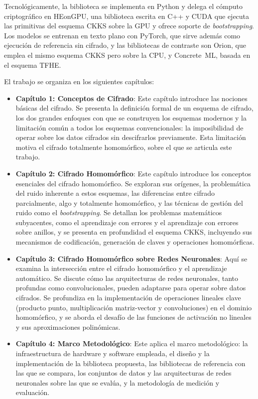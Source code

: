 Tecnológicamente, la biblioteca se implementa en Python y delega el cómputo criptográfico en HEonGPU, una biblioteca escrita en C++ y CUDA que ejecuta las primitivas del esquema CKKS sobre la GPU y ofrece soporte de \textit{bootstrapping}. Los modelos se entrenan en texto plano con PyTorch, que sirve además como ejecución de referencia sin cifrado, y las bibliotecas de contraste son Orion, que emplea el mismo esquema CKKS pero sobre la CPU, y Concrete~ML, basada en el esquema TFHE.

El trabajo se organiza en los siguientes capítulos:

\begin{itemize}
   \item \textbf{Capítulo 1: Conceptos de Cifrado}:
Este capítulo introduce las nociones básicas del cifrado. Se presenta la definición formal de un esquema de cifrado, los dos grandes enfoques con que se construyen los esquemas modernos y la limitación común a todos los esquemas convencionales: la imposibilidad de operar sobre los datos cifrados sin descifrarlos previamente. Esta limitación motiva el cifrado totalmente homomórfico, sobre el que se articula este trabajo.

   \item \textbf{Capítulo 2: Cifrado Homomórfico}:
Este capítulo introduce los conceptos esenciales del cifrado homomórfico. Se exploran sus orígenes, la problemática del ruido inherente a estos esquemas, las diferencias entre cifrado parcialmente, algo y totalmente homomórfico, y las técnicas de gestión del ruido como el \textit{bootstrapping}. Se detallan los problemas matemáticos subyacentes, como el aprendizaje con errores y el aprendizaje con errores sobre anillos, y se presenta en profundidad el esquema CKKS, incluyendo sus mecanismos de codificación, generación de claves y operaciones homomórficas.

   \item \textbf{Capítulo 3: Cifrado Homomórfico sobre Redes Neuronales}:
Aquí se examina la intersección entre el cifrado homomórfico y el aprendizaje automático. Se discute cómo las arquitecturas de redes neuronales, tanto profundas como convolucionales, pueden adaptarse para operar sobre datos cifrados. Se profundiza en la implementación de operaciones lineales clave (producto punto, multiplicación matriz-vector y convoluciones) en el dominio homomórfico, y se aborda el desafío de las funciones de activación no lineales y sus aproximaciones polinómicas.

   \item \textbf{Capítulo 4: Marco Metodológico}:
Este aplica el marco metodológico: la infraestructura de hardware y software empleada, el diseño y la implementación de la biblioteca propuesta, las bibliotecas de referencia con las que se compara, los conjuntos de datos y las arquitecturas de redes neuronales sobre las que se evalúa, y la metodología de medición y evaluación.


\end{itemize}
